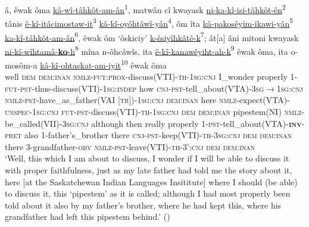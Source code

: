 \documentclass[twoside,a4paper,11pt]{article}
\newcommand{\sg}{\textsc{sg}}
\newcommand{\cnj}{\textsc{cnj}}
\newcommand{\dem}{\textsc{dem}}
\newcommand{\fut}{\textsc{fut}}
\newcommand{\inan}{\textsc{inan}}
\newcommand{\indep}{\textsc{indep}}
\newcommand{\inv}{\textsc{inv}}
\newcommand{\nmlz}{\textsc{nmlz}}
\newcommand{\obv}{\textsc{obv}}
\newcommand{\pret}{\textsc{pret}}
\newcommand{ \prox}{\textsc{prox}}
\newcommand{\pst}{\textsc{pst}}
\newcommand{\theme}{\textsc{th}}
\newcommand{\tr}{\textsc{tr}}
\newcommand{\unspec}{\textsc{unspec}}
\begin{document}
\begin{exe}
\ex \label{ex:creeverbs}
 \gll â, êwak ôma \underline{kâ-wî-tâhkôt-am-ân}\textsf{\textsuperscript{1}}, {matwân cî} kwayask \underline{ni-ka-kî-isi-tâhkôt-ên}\textsf{\textsuperscript{2}} tânis \underline{ê-kî-itâcimostaw-it}\textsf{\textsuperscript{3}} \underline{kâ-kî-oyôhtâwî-yân}\textsf{\textsuperscript{4}}, ôm îta \underline{kâ-pakosêyim-ikawi-yân}\textsf{\textsuperscript{5}} \underline{ka-kî-tâhkôt-am-ân}\textsf{\textsuperscript{6}}, êwak ôm `ôskiciy' \underline{k-êsiyîhkâtê-k}\textsf{\textsuperscript{7}}; ât[a] âni mitoni kwayask \underline{ni-kî-wîhtamâ-\textbf{ko}-h}\textsf{\textsuperscript{8}} mîna n-ôhcâwîs, ita \underline{ê-kî-kanawêyiht-ah-k}\textsf{\textsuperscript{9}} êwak ôma, ita o-mosôm-a \underline{kâ-kî-ohtaskat-am-iyit}\textsf{\textsuperscript{10}} êwak ôma\\
well {\dem} {\dem{:}\inan} {\nmlz-\fut{:}\prox-discuss(VTI)-\theme-1\sg{:}\cnj} {I\_wonder} properly {1-\fut-\pst-thus-discuss(VTI)-1\sg:\indep} how {\cnj-\pst-tell\_about(VTA)-3\sg$\rightarrow$1\sg{:}\cnj} {\nmlz-\pst-have\_as\_father(VAI [\tr])-1\sg{:}\cnj} {\dem{:}\inan} here {\nmlz-expect(VTA)-\unspec-1\sg{:}\cnj} {\fut-\pst-discuss(VTI)-\theme-1\sg{:}\cnj} {\dem} {\dem{:}\inan} {pipestem(NI)} {\nmlz-be\_called(VII)-3\sg{:}\cnj} although then really properly {1-\pst-tell\_about(VTA)-\textbf{\inv}-\pret} {also} {1-father's\_brother} there {\cnj-\pst-keep(VTI)-\theme-3\sg{:}\cnj} {\dem} {\dem{:}\inan} there {3-grandfather-\obv} {\nmlz-\pst-leave(VTI)-\theme-3'{:}\cnj} {\dem} {\dem{:}\inan}\\
\glt `Well, this which I am about to discuss, I wonder if I will be able to discuss it with proper faithfulness, just as my late father had told me the story about it, here [at the Saskatchewan Indian Languages Insititute] where I should (be able) to discuss it, this `pipestem' as it is called; although I had most properly been told about it also by my father's brother, where he had kept this, where his grandfather had left this pipestem behind.' (\citealp[p. 107]{counselling})
\end{exe}
\end{document}
